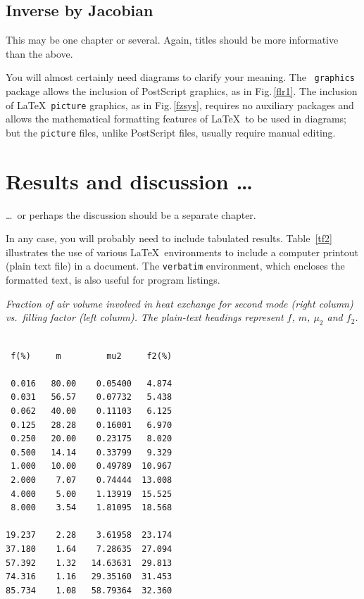 \documentclass[12pt,openany,a4paper]{book}
\renewcommand{\baselinestretch}{1.2}	%
\newcommand{\fig}[1]  {Fig.\,\ref{#1}}		%
\newcommand{\tab}[1]  {Table~\ref{#1}}		%
\begin{document}
\section{Inverse by Jacobian}





This may be one chapter or several.  Again, titles should be more
informative than the above.

You will almost certainly need diagrams to clarify your meaning.  The
\LaTeXe\ \texttt{graphics} package allows the inclusion of PostScript
graphics, as in \fig{flr1}.  The inclusion of \LaTeX\ \texttt{picture}
graphics, as in \fig{fzsys}, requires no auxiliary packages and allows
the mathematical formatting features of \LaTeX\ to be used in
diagrams; but the \texttt{picture} files, unlike PostScript files,
usually require manual editing.

\chapter{Results and discussion \ldots}

\ldots\ or perhaps the discussion should be a separate chapter.

In any case, you will probably need to include tabulated results.
\tab{tf2} illustrates the use of various \LaTeX\ environments to
include a computer printout (plain text file) in a document.  The
\texttt{verbatim} environment, which encloses the formatted text, is
also useful for program listings.

\begin{table}\renewcommand{\baselinestretch}{1.0}
\caption{\sl Fraction of air volume involved in heat exchange for
second mode (right column) vs.\ filling factor (left column).  The
plain-text headings represent $f$, $m$, $\mu_2$ and $f_2$.}
\label{tf2}

\begin{center}
\begin{minipage}[c]{2.85in}\small\normalsize
\begin{verbatim}

 f(%)     m         mu2     f2(%)

 0.016   80.00    0.05400   4.874
 0.031   56.57    0.07732   5.438
 0.062   40.00    0.11103   6.125
 0.125   28.28    0.16001   6.970
 0.250   20.00    0.23175   8.020
 0.500   14.14    0.33799   9.329
 1.000   10.00    0.49789  10.967
 2.000    7.07    0.74444  13.008
 4.000    5.00    1.13919  15.525
 8.000    3.54    1.81095  18.568

19.237    2.28    3.61958  23.174
37.180    1.64    7.28635  27.094
57.392    1.32   14.63631  29.813
74.316    1.16   29.35160  31.453
85.734    1.08   58.79364  32.360
\end{verbatim}
\end{minipage}
\end{center}
\end{table}
\end{document}
